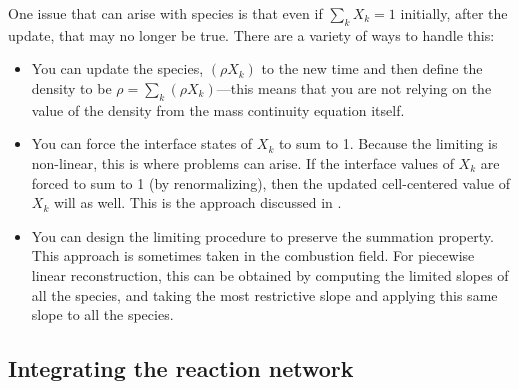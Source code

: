 One issue that can arise with species is that even if $\sum_k X_k = 1$
initially, after the update, that may no longer be true.  There are a
variety of ways to handle this:
\begin{itemize}
\item You can update the species, $(\rho X_k)$ to the new time and then
define the density to be $\rho = \sum_k (\rho X_k)$---this means that
you are not relying on the value of the density from the mass continuity
equation itself.

\item You can force the interface states of $X_k$ to sum to 1.  Because
the limiting is non-linear, this is where problems can arise.  If the
interface values of $X_k$ are forced to sum to 1 (by renormalizing), then
the updated cell-centered value of $X_k$ will as well.  This is the
approach discussed in \cite{plewamuller:1999}.

\item You can design the limiting procedure to preserve the summation
property.  This approach is sometimes taken in the combustion field.
For piecewise linear reconstruction, this can be obtained by computing
the limited slopes of all the species, and taking the most restrictive
slope and applying this same slope to all the species.
\end{itemize}


\subsection{Integrating the reaction network}

